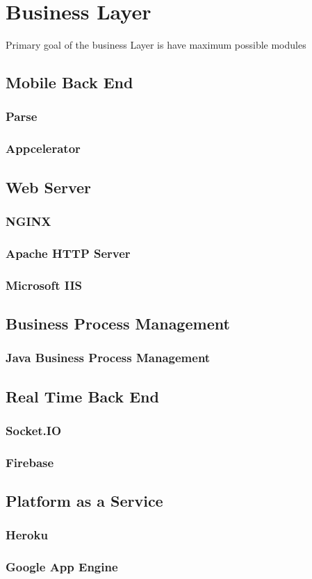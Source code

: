 \chapter{Business Layer}\label{ch:ch4label}
			Primary goal of the business Layer is have maximum possible modules  

\section{Mobile Back End}

\subsection{Parse}
\subsection{Appcelerator}

\section{Web Server}

\subsection{NGINX}
\subsection{Apache HTTP Server}
\subsection{Microsoft IIS}

\section{Business Process Management}

\subsection{Java Business Process Management}

\section{Real Time Back End}

\subsection{Socket.IO}
\subsection{Firebase}


\section{Platform as a Service}
\subsection{Heroku}
\subsection{Google App Engine}



